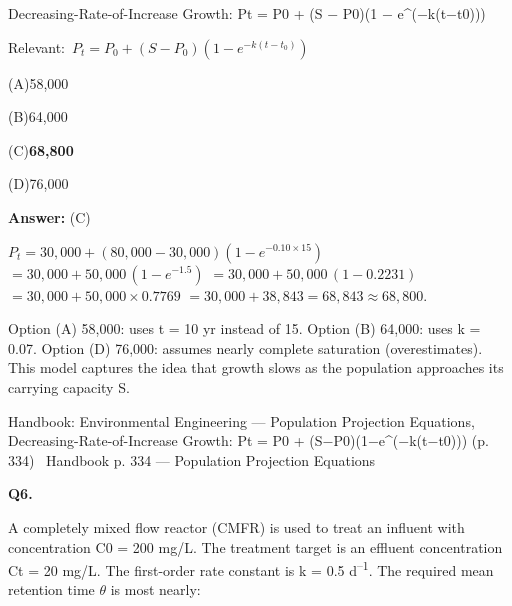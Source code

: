 \documentclass[11pt]{article}
\newcommand{\correct}[1]{\textbf{#1}\;{\color{accent}$\checkmark$}}
\newcommand{\optline}[2]{\par\noindent\hspace{1.2em}(#1)\hspace{0.6em}#2}
\begin{document}
Decreasing-Rate-of-Increase Growth: Pt = P0 + (S $-$ P0)(1 $-$ e\textasciicircum{}($-$k(t$-$t0)))\par\vspace{3pt}
{\small\color{soft}Relevant:}\ $P_t = P_0 + (S - P_0)\left(1 - e^{-k(t-t_0)}\right)$\par\vspace{3pt}
\optline{A}{58,000}
\optline{B}{64,000}
\optline{C}{\correct{68,800}}
\optline{D}{76,000}
\par\vspace{3pt}
\vspace{2pt}\par\noindent\colorbox{boxbg}{\parbox{\dimexpr\linewidth-2\fboxsep\relax}{%
\vspace{2pt}\textbf{Answer:} (C)\par\vspace{2pt}
{\small $P_t = 30{,}000 + (80{,}000 - 30{,}000)(1 - e^{-0.10 \times 15})$
$= 30{,}000 + 50{,}000\,(1 - e^{-1.5})$
$= 30{,}000 + 50{,}000\,(1 - 0.2231)$
$= 30{,}000 + 50{,}000 \times 0.7769$
$= 30{,}000 + 38{,}843 = 68{,}843 \approx 68{,}800$.

Option (A) 58,000: uses t = 10 yr instead of 15. Option (B) 64,000: uses k = 0.07. Option (D) 76,000: assumes nearly complete saturation (overestimates). This model captures the idea that growth slows as the population approaches its carrying capacity S.}\par\vspace{2pt}
{\footnotesize\color{soft}Handbook: Environmental Engineering --- Population Projection Equations, Decreasing-Rate-of-Increase Growth: Pt = P0 + (S$-$P0)(1$-$e\textasciicircum{}($-$k(t$-$t0))) (p. 334) \textbullet\ Handbook p. 334 --- Population Projection Equations}\vspace{2pt}
}}
\vspace{9pt}
\filbreak
\textbf{\color{accent}Q6.}\par\vspace{2pt}
A completely mixed flow reactor (CMFR) is used to treat an influent with concentration C0 = 200 mg/L. The treatment target is an effluent concentration Ct = 20 mg/L. The first-order rate constant is k = 0.5 d\textsuperscript{--}\textsuperscript{1}. The required mean retention time $\theta$ is most nearly:
\end{document}
